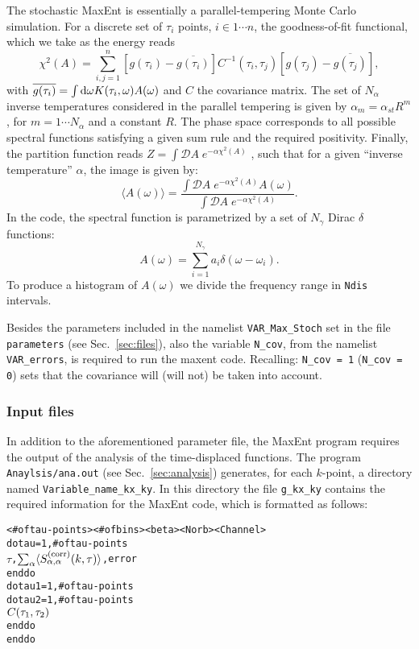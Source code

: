 The stochastic MaxEnt is essentially a parallel-tempering Monte Carlo simulation.  For a discrete set of $\tau_i$ points,  $i \in 1 \cdots n $, the goodness-of-fit functional, which we take as the energy reads
\begin{equation}
  \chi^{2}(A) =  \sum_{i,j=1}^{n}   \left[ g(\tau_i)  -  \overline{g(\tau_i)} \right] C^{-1}(\tau_i,\tau_j) \left[    g(\tau_j)  -  \overline{g(\tau_j)} \right] ,
\end{equation}
with $ \overline{g(\tau_i)} =\int \mathrm{d}{\omega} K(\tau_{i},\omega)  A(\omega)$ and  $C$ the covariance matrix. 
The set of $N_{\alpha}$ inverse temperatures considered in the parallel tempering is given by
$ \alpha_m = \alpha_{st}  R^{m}$, for $m = 1 \cdots N_{\alpha} $ and a constant $R$. The phase space corresponds to all possible spectral functions satisfying a given sum rule and the required positivity.  Finally, the partition function reads
$Z =  \int\mathcal{D}\!A\; e^{-\alpha \chi^{2}(A)}$ \cite{Beach04a}, such that for a given ``inverse temperature'' $\alpha$, the image is given by: 
\begin{equation}
  \langle A ( \omega) \rangle  =   \frac{\int\mathcal{D}\!A\; e^{-\alpha \chi^{2}(A)}  A(\omega) }{ \int\mathcal{D}\!A\; e^{-\alpha \chi^{2}(A)}  }.
\end{equation}
In the code, the spectral function is parametrized  by a  set of $N_{\gamma}$ Dirac $\delta$ functions: 
\begin{equation}
      A(\omega)  = \sum_{i=1}^{N_{\gamma}} a_{i} \delta \left( \omega - \omega_i \right).
\end{equation}
To produce a histogram of  $ A(\omega) $ we divide  the frequency range in \texttt{Ndis} intervals. 

Besides the parameters included in the namelist \texttt{VAR\_Max\_Stoch} set in the file \texttt{parameters} (see Sec.~\ref{sec:files}), also the variable \texttt{N\_cov}, from the namelist \texttt{VAR\_errors}, is required to run the maxent code. Recalling: \texttt{N\_cov = 1} (\texttt{N\_cov = 0}) sets that the covariance will (will not) be taken into account.

\subsubsection*{Input files} 
In addition to the aforementioned parameter file, the MaxEnt program requires the output of the  analysis of the time-displaced functions. The program \texttt{Anaylsis/ana.out} (see Sec.~\ref{sec:analysis}) generates, for each $k$-point, a directory named   \texttt{Variable\_name\_kx\_ky}.  In this directory  the file \texttt{g\_kx\_ky} contains the  required information for the MaxEnt code, which is formatted as follows:
\begin{alltt}
<# of tau-points>  <# of bins >  <beta>  <Norb>  <Channel>
do tau = 1, # of tau-points
   \( \tau\),  \( \sum\sb{\alpha}\langle{S}\sb{\alpha,\alpha}\sp{(\mathrm{corr})}(k,\tau)\rangle\),   error
enddo
do tau1 = 1, # of tau-points
  do tau2 = 1, # of tau-points
     \( C(\tau\sb{1},\tau\sb{2}) \)
  enddo
enddo
\end{alltt}

